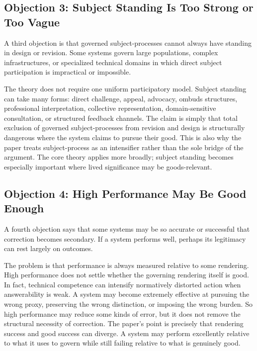 \documentclass[11pt]{article}
\begin{document}
\subsection{Objection 3: Subject Standing Is Too Strong or Too Vague}

A third objection is that governed subject-processes cannot always have standing in design or revision. Some systems govern large populations, complex infrastructures, or specialized technical domains in which direct subject participation is impractical or impossible.

The theory does not require one uniform participatory model. Subject standing can take many forms: direct challenge, appeal, advocacy, ombuds structures, professional interpretation, collective representation, domain-sensitive consultation, or structured feedback channels. The claim is simply that total exclusion of governed subject-processes from revision and design is structurally dangerous where the system claims to pursue their good. This is also why the paper treats subject-process as an intensifier rather than the sole bridge of the argument. The core theory applies more broadly; subject standing becomes especially important where lived significance may be goods-relevant.

\subsection{Objection 4: High Performance May Be Good Enough}

A fourth objection says that some systems may be so accurate or successful that correction becomes secondary. If a system performs well, perhaps its legitimacy can rest largely on outcomes.

The problem is that performance is always measured relative to some rendering. High performance does not settle whether the governing rendering itself is good. In fact, technical competence can intensify normatively distorted action when answerability is weak. A system may become extremely effective at pursuing the wrong proxy, preserving the wrong distinction, or imposing the wrong burden. So high performance may reduce some kinds of error, but it does not remove the structural necessity of correction.\cite{ObermeyerEtAl2019DissectingRacialBias,ManheimGarrabrant2019GoodhartsLaw} The paper's point is precisely that rendering success and good success can diverge. A system may perform excellently relative to what it uses to govern while still failing relative to what is genuinely good.
\end{document}
